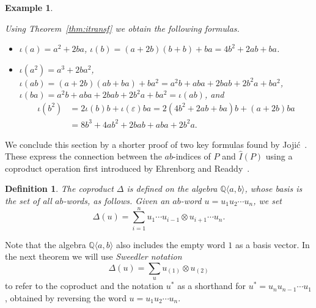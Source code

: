 \documentclass[reqno,12pt]{amsart}
\numberwithin{equation}{section}
\newtheorem{definition}[theorem]{Definition}
\newtheorem{example}[theorem]{Example}
\newcommand{\0}{\widehat{0}}
\newcommand{\1}{\widehat{1}}
\newcommand{\2}{\widehat{2}}
\newcommand{\grI}{\widehat{I}}
\newcommand{\iab}{\iota}
\begin{document}
\begin{example}
\label{ex:iab}
{\em
Using Theorem~\ref{thm:itransf} we obtain the following formulas.
\begin{itemize}
\item[$n=1$:] $\iab(a)=a^2+2ba$, $\iab(b)=(a+2b)(b+b)+ba=4b^2+2ab+ba$. 
\item[$n=2$:] $\iab(a^2)=a^3+2ba^2$,
  $\iab(ab)=(a+2b)(ab+ba)+ba^2=a^2b+aba+2bab+2b^2a+ba^2$,
  $\iab(ba)=a^2b+aba+2bab+2b^2a+ba^2=\iab(ab)$, and 
\begin{align*}
  \iab(b^2)&=2\iab(b)b+\iab(\varepsilon)ba=2(4b^2+2ab+ba)b+(a+2b)ba\\
  &=8b^3+4ab^2+2bab+aba+2b^2a.
\end{align*}  
\end{itemize}
}
\end{example}

We conclude this section by a shorter proof of two key formulas
found by Joji\'{c}~\cite{Jojic}. These express the connection between
the $ab$-indices of $P$ and $\grI(P)$ using a coproduct operation first
introduced by Ehrenborg and Readdy~\cite{Ehrenborg-Readdy-cop}.
\begin{definition}
The coproduct $\Delta$ is defined on the algebra ${\mathbb Q}\langle a,
b\rangle$, whose basis is the set of all $ab$-words, as follows. Given
an $ab$-word $u=u_1u_2\cdots u_n$, we set
$$
\Delta(u)=\sum_{i=1}^n u_1\cdots u_{i-1}\otimes u_{i+1}\cdots u_n. 
$$
\end{definition}  
Note that the algebra  ${\mathbb Q}\langle a,b\rangle$ also includes the
empty word $1$ as a basis vector. In the next theorem we will use {\em
  Sweedler notation}
$$
\Delta(u)=\sum_{u} u_{(1)} \otimes u_{(2)}
$$
to refer to the coproduct and the notation $u^*$ as a
shorthand for $u^*=u_nu_{n-1}\cdots u_1$, obtained by reversing the word
$u=u_1u_2\cdots u_n$. 
\end{document}
